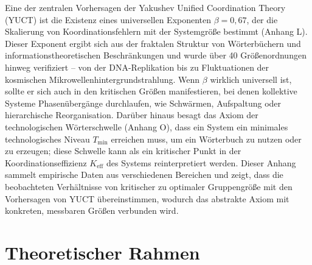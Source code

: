 \documentclass[12pt]{article}
\theoremstyle{remark}
\newcommand{\Keff}{K_{\mathrm{eff}}}
\newcommand{\Tmin}{T_{\min}}
\begin{document}
	Eine der zentralen Vorhersagen der Yakushev Unified Coordination Theory (YUCT) ist die Existenz eines universellen Exponenten $\beta = 0,67$, der die Skalierung von Koordinationsfehlern mit der Systemgröße bestimmt (Anhang L). Dieser Exponent ergibt sich aus der fraktalen Struktur von Wörterbüchern und informationstheoretischen Beschränkungen und wurde über 40 Größenordnungen hinweg verifiziert – von der DNA-Replikation bis zu Fluktuationen der kosmischen Mikrowellenhintergrundstrahlung. Wenn $\beta$ wirklich universell ist, sollte er sich auch in den kritischen Größen manifestieren, bei denen kollektive Systeme Phasenübergänge durchlaufen, wie Schwärmen, Aufspaltung oder hierarchische Reorganisation. Darüber hinaus besagt das Axiom der technologischen Wörterschwelle (Anhang O), dass ein System ein minimales technologisches Niveau $\Tmin$ erreichen muss, um ein Wörterbuch zu nutzen oder zu erzeugen; diese Schwelle kann als ein kritischer Punkt in der Koordinationseffizienz $\Keff$ des Systems reinterpretiert werden. Dieser Anhang sammelt empirische Daten aus verschiedenen Bereichen und zeigt, dass die beobachteten Verhältnisse von kritischer zu optimaler Gruppengröße mit den Vorhersagen von YUCT übereinstimmen, wodurch das abstrakte Axiom mit konkreten, messbaren Größen verbunden wird.
	
	\section{Theoretischer Rahmen}
	\label{sec:theory}
	
\end{document}
